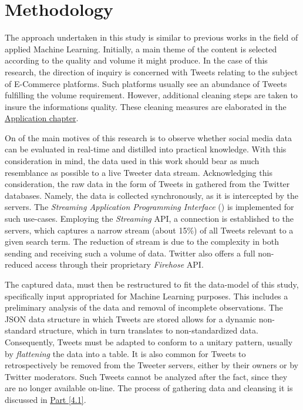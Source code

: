 \section{Methodology}
	The approach undertaken in this study is similar to previous works in the field of applied Machine Learning. Initially, a main theme of the content is selected according to the quality and volume it might produce. In the case of this research, the direction of inquiry is concerned with Tweets relating to the subject of E-Commerce platforms. Such platforms usually see an abundance of Tweets fulfilling the volume requirement. However, additional cleaning steps are taken to insure the informations quality. These cleaning measures are elaborated in the \hyperref[Application]{Application chapter}.
	
	\par
	
	On of the main motives of this research is to observe whether social media data can be evaluated in real-time and distilled into practical knowledge. With this consideration in mind, the data used in this work should bear as much resemblance as possible to a live Tweeter data stream. Acknowledging this consideration, the raw data in the form of Tweets in gathered from the Twitter databases. Namely, the data is collected synchronously, as it is intercepted by the servers. The \textit{Streaming Application Programming Interface} (\cite{stream_api}) is implemented for such use-cases. Employing the \textit{Streaming} API, a connection is established to the servers, which captures a narrow stream (about 15\%) of all Tweets relevant to a given search term. The reduction of stream is due to the complexity in both sending and receiving such a volume of data. Twitter also offers a full non-reduced access through their proprietary \textit{Firehose} API.
	
	\par
	
	The captured data, must then be restructured to fit the data-model of this study, specifically input appropriated for Machine Learning purposes. This includes a preliminary analysis of the data and removal of incomplete observations. The JSON data structure in which Tweets are stored allows for a dynamic non-standard structure, which in turn translates to non-standardized data. Consequently, Tweets must be adapted to conform to a unitary pattern, usually by \textit{flattening} the data into a table. It is also common for Tweets to retrospectively be removed from the Tweeter servers, either by their owners or by Twitter moderators. Such Tweets cannot be analyzed after the fact, since they are no longer available on-line. The process of gathering data and cleansing it is discussed in \hyperref[sec:collect_data]{Part [4.1]}.
	
